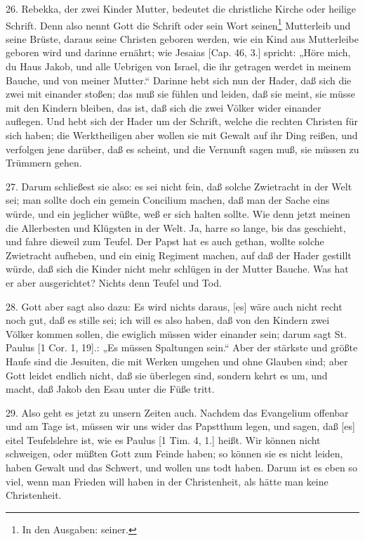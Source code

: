 26. Rebekka, der zwei Kinder Mutter, bedeutet die christliche Kirche oder heilige Schrift. Denn also nennt Gott die Schrift oder sein Wort seinen\footnote{In den Ausgaben: seiner.} Mutterleib und seine Brüste, daraus seine Christen geboren werden, wie ein Kind aus Mutterleibe geboren wird und darinne ernährt; wie Jesaias [Cap. 46, 3.] spricht: „Höre mich, du Haus Jakob, und alle Uebrigen von Israel, die ihr getragen werdet in meinem Bauche, und von meiner Mutter.“ Darinne hebt sich nun der Hader, daß sich die zwei mit einander stoßen; das muß sie fühlen und leiden, daß sie meint, sie müsse mit den Kindern bleiben, das ist, daß sich die zwei Völker wider einander auflegen. Und hebt sich der Hader um der Schrift, welche die rechten Christen für sich haben; die Werktheiligen aber wollen sie mit Gewalt auf ihr Ding reißen, und verfolgen jene darüber, daß es scheint, und die Vernunft sagen muß, sie müssen zu Trümmern gehen.

27. Darum schließest sie also: es sei nicht fein, daß solche Zwietracht in der Welt sei; man sollte doch ein gemein Concilium machen, daß man der Sache eins würde, und ein jeglicher wüßte, weß er sich halten sollte. Wie denn jetzt meinen die Allerbesten und Klügsten in der Welt. Ja, harre
so lange, bis das geschieht, und fahre dieweil zum Teufel. Der Papst hat es auch gethan, wollte solche Zwietracht aufheben, und ein einig Regiment machen, auf daß der Hader gestillt würde, daß sich die Kinder nicht mehr schlügen in der Mutter Bauche. Was hat er aber ausgerichtet? Nichts denn Teufel und Tod.

28. Gott aber sagt also dazu: Es wird nichts daraus, [es] wäre auch nicht recht noch gut, daß es stille sei; ich will es also haben, daß von den Kindern zwei Völker kommen sollen, die ewiglich müssen wider einander sein; darum sagt St. Paulus [1 Cor. 1, 19].: „Es müssen Spaltungen sein.“ Aber der stärkste und größte Haufe sind die Jesuiten, die mit Werken umgehen und ohne Glauben sind; aber Gott leidet endlich nicht, daß sie überlegen sind, sondern kehrt es um, und macht, daß Jakob den Esau unter die Füße tritt.

29. Also geht es jetzt zu unsern Zeiten auch. Nachdem das Evangelium offenbar und am Tage ist, müssen wir uns wider das Papstthum legen, und sagen, daß [es] eitel Teufelslehre ist, wie es Paulus [1 Tim. 4, 1.] heißt. Wir können nicht schweigen, oder müßten Gott zum Feinde haben; so können sie es nicht leiden, haben Gewalt und das Schwert, und wollen uns todt haben. Darum ist es eben so viel, wenn man Frieden will haben in der Christenheit, als hätte man keine Christenheit.

